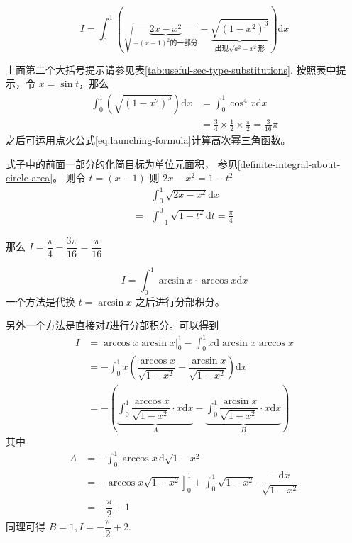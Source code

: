 \begin{example}\label{example:w660t60}
    \[
        I = \int_0^1 \left(\sqrt{\underbrace{2x-x^2}_{-(x-1)^2\mbox{的一部分}}} 
        - \underbrace{\sqrt{(1-x^2)^3}}_{\mbox{出现}\sqrt{a^2-x^2}\mbox{形}}\right) \mathrm{d}x
    \]
    \cite[page 24, question 60]{w660}

    上面第二个大括号提示请参见表\ref{tab:useful-sec-type-substitutions}.
    按照表中提示，令 $x = \sin t$，那么
    \begin{align*}
        \int_0^1 \left(
            \sqrt{(1-x^2)^3}
        \right) \mathrm{d}x
        &=
        \int_0^1 
            \cos^4 x
        \mathrm{d}x\\
        &=
        \frac{3}{4} \times \frac{1}{2} \times \frac{\pi}{2} = \frac{3}{16} \pi
    \end{align*}
    之后可运用点火公式\ref{eq:launching-formula}计算高次幂三角函数。

    式子中的前面一部分的化简目标为单位元面积，
    参见\ref{definite-integral-about-circle-area}。
    则令 $t = (x-1)$ 则 $2x-x^2 = 1-t^2$
    \begin{align*}
        &\int_0^1 \sqrt{2x-x^2} \mathrm{d}x\\
        = 
        &\int_{-1}^0 \sqrt{1-t^2} \mathrm{d}t = \frac{\pi}{4}
    \end{align*}
    
    那么 $I = \dfrac{\pi}{4} - \dfrac{3\pi}{16} = \dfrac{\pi}{16}$
\end{example}

\begin{example}
    \[
        I = \int_0^1 \arcsin x \cdot \arccos x \mathrm{d}x
    \]
    \cite[page 24, question 59]{w660}
    一个方法是代换 $t = \arcsin x$ 之后进行分部积分。

    另外一个方法是直接对$I$进行分部积分。可以得到
    \begin{align*}
        I &= \left. \arccos x \arcsin x \right|^{1}_{0} 
             - \int_0^1 x \mathrm{d} \arcsin x \arccos x \\
          &= - \int_0^1 x 
          \left(
              \dfrac{\arccos x}{\sqrt{1-x^2}} 
              - \dfrac{\arcsin x}{\sqrt{1-x^2}}
          \right)
          \mathrm{d}x \\
          &= - 
          \left(
              \underbrace{
                  \int_0^1
                      \dfrac{\arccos x}{\sqrt{1-x^2}} \cdot x
                  \mathrm{d}x 
              }_{A}
              -
              \underbrace{
                  \int_0^1
                      \dfrac{\arcsin x}{\sqrt{1-x^2}} \cdot x
                  \mathrm{d}x 
              }_{B}
          \right)
    \end{align*}
    其中
    \begin{align*}
        A &= - \int_0^1 \arccos x \, \mathrm{d} \sqrt{1-x^2} \\
          &= \left.- \arccos x \sqrt{1-x^2}\right]_0^1 + \int_0^1 \sqrt{1-x^2} \cdot 
              \dfrac{-\mathrm{d}x}{\sqrt{1-x^2}} \\
          &= - \dfrac{\pi}{2} + 1 
    \end{align*}
    同理可得 $B = 1, I = -\dfrac{\pi}{2} + 2$.
\end{example}

